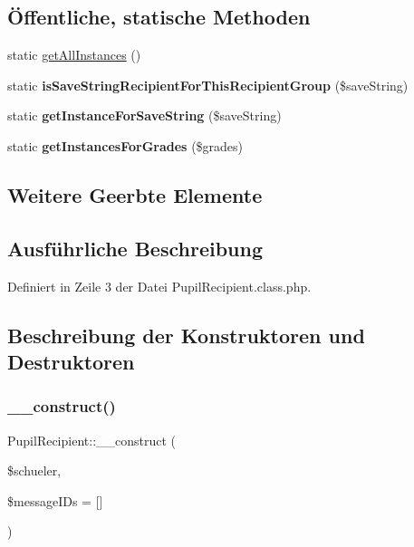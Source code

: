 \subsection*{Öffentliche, statische Methoden}
\begin{DoxyCompactItemize}
\item 
static \mbox{\hyperlink{class_pupil_recipient_a70d785340a48ab40f2c3ca5743c48f3d}{get\+All\+Instances}} ()
\item 
\mbox{\label{class_pupil_recipient_a2e979b0adcf5f5a65eae610e0d0d8a35}} 
static {\bfseries is\+Save\+String\+Recipient\+For\+This\+Recipient\+Group} (\$save\+String)
\item 
\mbox{\label{class_pupil_recipient_a689a7a92f7af8c91591a39767071a0ef}} 
static {\bfseries get\+Instance\+For\+Save\+String} (\$save\+String)
\item 
\mbox{\label{class_pupil_recipient_a10dc34214e951f76647d7c3a2bc6aa24}} 
static {\bfseries get\+Instances\+For\+Grades} (\$grades)
\end{DoxyCompactItemize}
\subsection*{Weitere Geerbte Elemente}


\subsection{Ausführliche Beschreibung}


Definiert in Zeile 3 der Datei Pupil\+Recipient.\+class.\+php.



\subsection{Beschreibung der Konstruktoren und Destruktoren}
\mbox{\label{class_pupil_recipient_aee012c08ccc819a105174089e89eb9a5}} 
\subsubsection{\texorpdfstring{\+\_\+\+\_\+construct()}{\_\_construct()}}
{\footnotesize\ttfamily Pupil\+Recipient\+::\+\_\+\+\_\+construct (\begin{DoxyParamCaption}\item[{}]{\$schueler,  }\item[{}]{\$message\+I\+Ds = {\ttfamily \mbox{[}\mbox{]}} }\end{DoxyParamCaption})}


